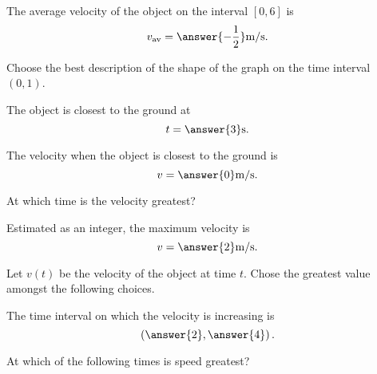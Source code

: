 \documentclass{ximera}
\begin{document}
\begin{exercise}
The average velocity of the object on the interval $\left[0,6\right]$ is
\[
v_{\text{av}} = \answer{-\frac{1}{2}}\text{m/s}.
\]

Choose the best description of the shape of the graph on the time interval $\left(0,1\right)$.
\begin{multipleChoice}
\end{multipleChoice}

The object is closest to the ground at 
\[
t=\answer{3}\text{s}.
\]

The velocity when the object is closest to the ground is 
\[
v=\answer{0}\text{m/s}.
\]

At which time is the velocity greatest?
\begin{multipleChoice}
\end{multipleChoice}

Estimated as an integer, the maximum velocity is
\[
v=\answer{2}\text{m/s}.
\]

Let $v(t)$ be the velocity of the object at time $t$.  Chose the greatest value amongst the following choices.
\begin{multipleChoice}
\end{multipleChoice}

The time interval on which the velocity is increasing is
\[
\left(\answer{2},\answer{4}\right).
\]

At which of the following times is speed greatest?
\begin{multipleChoice}
\end{multipleChoice}

\end{exercise}
\end{document}

